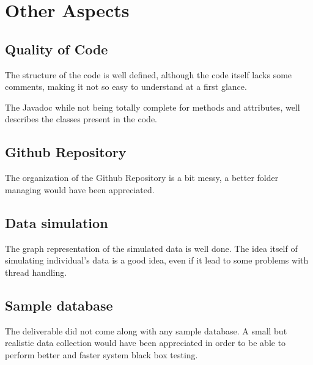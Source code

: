 \section{Other Aspects}



\subsection{Quality of Code}

The structure of the code is well defined, although the code itself lacks some comments, making it not so easy to understand at a first glance. 

The Javadoc while not being totally complete for methods and attributes, well describes the classes present in the code.


\subsection{Github Repository}

The organization of the Github Repository is a bit messy, a better folder managing would have been appreciated.


\subsection{Data simulation}

The graph representation of the simulated data is well done. The idea itself of simulating individual's data is a good idea, even if it lead to some problems with thread handling.

\subsection{Sample database}

The deliverable did not come along with any sample database.
A small but realistic data collection would have been appreciated in order to be able to perform better and faster system black box testing.


